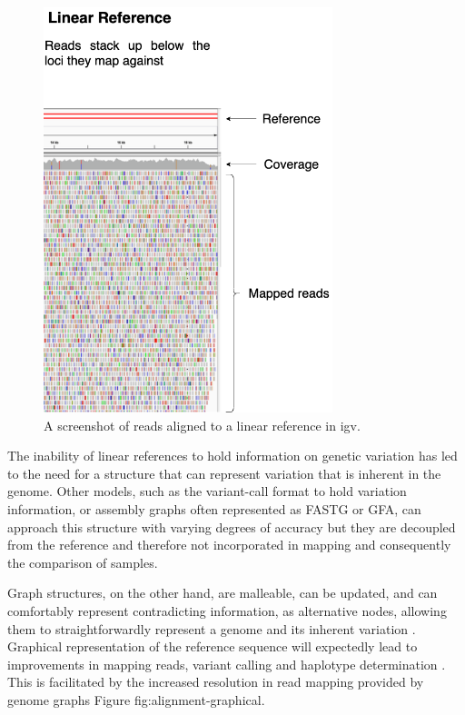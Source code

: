\documentclass[10pt, a4paper]{article}
\begin{document}
\begin{figure}[htbp]
\centering
\includegraphics[width=0.75\textwidth]{../Figures/Alignment-igv.png}
\caption[Read alignment against a linear reference]{\label{fig:org5adc1e2}A screenshot of reads aligned to a linear reference in igv.}
\end{figure}


The inability of linear references to hold information on genetic variation has
led to the need for a structure that can represent variation that is inherent in
the genome.
Other models, such as the variant-call format to hold variation information, or
assembly graphs often represented as FASTG or GFA, can approach this structure
with varying degrees of accuracy but they are decoupled from the reference and
therefore not incorporated in mapping and consequently the comparison of
samples. 

Graph structures, on the other hand, are malleable, can be updated, and can
comfortably represent contradicting information, as alternative nodes, allowing
them to straightforwardly represent a genome and its inherent variation
\cite{patenGenomeGraphsEvolution2017,liDesignConstructionReference2020}.
Graphical representation of the reference sequence will expectedly lead to
improvements in mapping reads, variant calling and haplotype determination
\cite{patenGenomeGraphsEvolution2017}.
This is facilitated by the increased resolution in read mapping provided by
genome graphs Figure fig:alignment-graphical.
\end{document}
